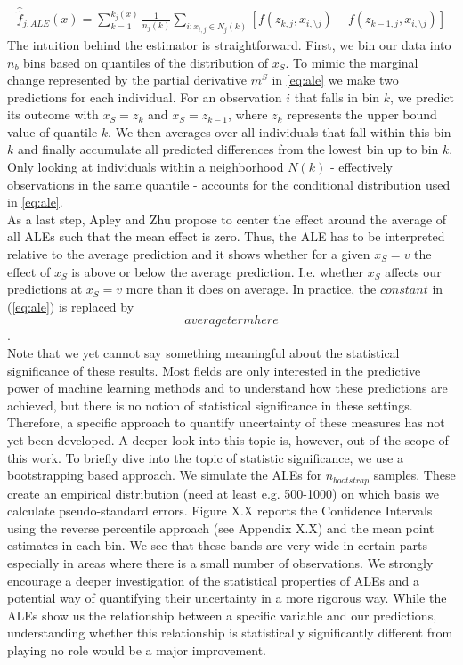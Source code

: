 \begin{align}
\hat{\tilde{f}}_{j, ALE}(x)=\sum_{k=1}^{k_j(x)} \frac{1}{n_j(k)}\sum_{i:x_{i,j}\in N_j(k)}[f(z_{k,j}, x_{i,\setminus j})-f(z_{k-1,j}, x_{i,\setminus j})] \label{eq:ale_estim}
\end{align}
The intuition behind the estimator is straightforward. First, we bin our data into $n_b$ bins based on quantiles of the distribution of $x_S$. To mimic the marginal change represented by the partial derivative $m^S$ in \ref{eq:ale} we make two predictions for each individual. For an observation $i$ that falls in bin $k$, we predict its outcome with $x_S=z_k$ and $x_S=z_{k-1}$, where $z_k$ represents the upper bound value of quantile $k$. We then averages over all individuals that fall within this bin $k$ and finally accumulate all predicted differences from the lowest bin up to bin $k$. Only looking at individuals within a neighborhood $N(k)$ - effectively observations in the same quantile - accounts for the conditional distribution used in \ref{eq:ale}. \\
As a last step, Apley and Zhu propose to center the effect around the average of all ALEs such that the mean effect is zero. Thus, the ALE has to be interpreted relative to the average prediction and it shows whether for a given $x_S=v$ the effect of $x_S$ is above or below the average prediction. I.e. whether $x_S$ affects our predictions at $x_S=v$ more than it does on average. In practice, the $constant$ in (\ref{eq:ale}) is replaced by $$average term here$$. \\
Note that we yet cannot say something meaningful about the statistical significance of these results. Most fields are only interested in the predictive power of machine learning methods and to understand how these predictions are achieved, but there is no notion of statistical significance in these settings. Therefore, a specific approach to quantify uncertainty of these measures has not yet been developed. A deeper look into this topic is, however, out of the scope of this work. To briefly dive into the topic of statistic significance, we use a bootstrapping based approach. We simulate the ALEs for $n_{bootstrap}$ samples. These create an empirical distribution (need at least e.g. 500-1000) on which basis we calculate pseudo-standard errors. Figure X.X reports the Confidence Intervals using the reverse percentile approach (see Appendix X.X) and the mean point estimates in each bin. We see that these bands are very wide in certain parts - especially in areas where there is a small number of observations. We strongly encourage a deeper investigation of the statistical properties of ALEs and a potential way of quantifying their uncertainty in a more rigorous way. While the ALEs show us the relationship between a specific variable and our predictions, understanding whether this relationship is statistically significantly different from playing no role would be a major improvement. 

